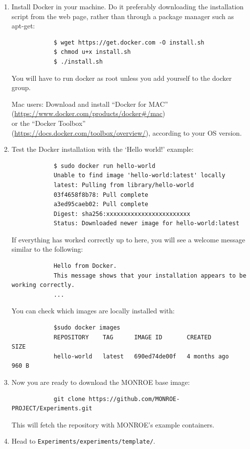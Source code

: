 \documentclass[a4paper,10pt]{article}
\newcommand{\VerbatimFont}{\footnotesize}
\newcommand{\monroe}{MONROE}
\newcommand{\identifier}[1]{{\texttt{\small{#1}}}}
\begin{document}
\begin{enumerate}
	\item Install Docker in your machine. Do it preferably downloading the installation script  from the web page, rather than through a package manager such as apt-get:
		{\VerbatimFont\begin{verbatim}
			$ wget https://get.docker.com -O install.sh
			$ chmod u+x install.sh
			$ ./install.sh
		\end{verbatim}}
		You will have to run docker as root unless you add yourself to the docker group.

		Mac users: Download and install ``Docker for MAC''\\
		(\url{https://www.docker.com/products/docker#/mac})\\
		or the ``Docker Toolbox''\\ (\url{https://docs.docker.com/toolbox/overview/}), according to your OS version.
	\item Test the Docker installation with the `Hello world!' example:
		{\VerbatimFont\begin{verbatim}
			$ sudo docker run hello-world
			Unable to find image 'hello-world:latest' locally
			latest: Pulling from library/hello-world
			03f4658f8b78: Pull complete
			a3ed95caeb02: Pull complete
			Digest: sha256:xxxxxxxxxxxxxxxxxxxxxxxx
			Status: Downloaded newer image for hello-world:latest
		\end{verbatim}}
		If everything has worked correctly up to here, you will see a welcome message similar to the following:
		{\VerbatimFont\begin{verbatim}
			Hello from Docker.
			This message shows that your installation appears to be working correctly.
			...
		\end{verbatim}}
		You can check which images are locally installed with:
		{\VerbatimFont\begin{verbatim}
			$sudo docker images
			REPOSITORY    TAG      IMAGE ID       CREATED        SIZE
			hello-world   latest   690ed74de00f   4 months ago   960 B
		\end{verbatim}}
  \item Now you are ready to download the \monroe{} base image:
		{\VerbatimFont\begin{verbatim}
			git clone https://github.com/MONROE-PROJECT/Experiments.git
		\end{verbatim}}
		This will fetch the repository with \monroe{}'s example containers.
	\item Head to \identifier{Experiments/experiments/template/}.

\end{enumerate}
\end{document}
